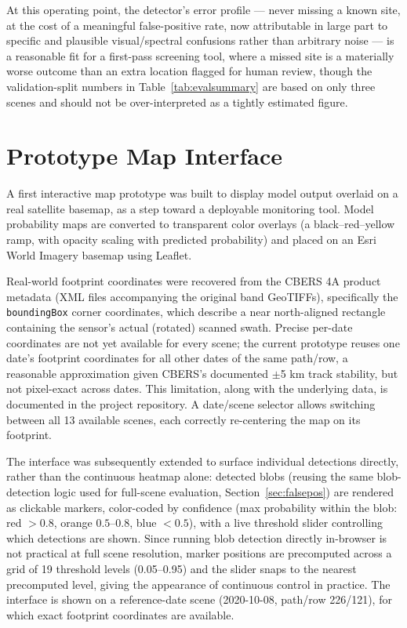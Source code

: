 \documentclass[11pt,a4paper]{article}
\begin{document}
At this operating point, the
detector's error profile --- never missing a known site, at the cost of a
meaningful false-positive rate, now attributable in large part to specific
and plausible visual/spectral confusions rather than arbitrary noise --- is
a reasonable fit for a first-pass screening tool, where a missed site is a
materially worse outcome than an extra location flagged for human review,
though the validation-split numbers in Table~\ref{tab:evalsummary} are
based on only three scenes and should not be over-interpreted as a tightly
estimated figure.

\section{Prototype Map Interface}
\label{sec:map}

A first interactive map prototype was built to display model output overlaid
on a real satellite basemap, as a step toward a deployable monitoring tool.
Model probability maps are converted to transparent color overlays (a
black--red--yellow ramp, with opacity scaling with predicted probability) and
placed on an Esri World Imagery basemap using Leaflet.

Real-world footprint coordinates were recovered from the CBERS 4A product
metadata (XML files accompanying the original band GeoTIFFs), specifically
the \texttt{boundingBox} corner coordinates, which describe a near
north-aligned rectangle containing the sensor's actual (rotated) scanned
swath. Precise per-date coordinates are not yet available for every scene;
the current prototype reuses one date's footprint coordinates for all other
dates of the same path/row, a reasonable approximation given CBERS's
documented $\pm$5 km track stability, but not pixel-exact across dates. This
limitation, along with the underlying data, is documented in the project
repository. A date/scene selector allows switching between all 13 available
scenes, each correctly re-centering the map on its footprint.

The interface was subsequently extended to surface individual detections
directly, rather than the continuous heatmap alone: detected blobs
(reusing the same blob-detection logic used for full-scene evaluation,
Section~\ref{sec:falsepos}) are rendered as clickable markers, color-coded
by confidence (max probability within the blob: red $>0.8$, orange
$0.5$--$0.8$, blue $<0.5$), with a live threshold slider controlling which
detections are shown. Since running blob detection directly in-browser is
not practical at full scene resolution, marker positions are precomputed
across a grid of 19 threshold levels (0.05--0.95) and the slider snaps to
the nearest precomputed level, giving the appearance of continuous control
in practice. The interface is shown on a reference-date scene (2020-10-08, path/row 226/121), for which exact
footprint coordinates are available.
\end{document}
